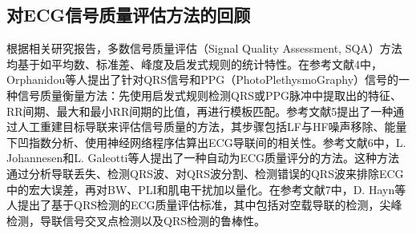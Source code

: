 \subsection{对ECG信号质量评估方法的回顾}

根据相关研究报告，多数信号质量评估（Signal Quality Assessment, SQA）方法均基于如平均数、标准差、峰度及启发式规则的统计特性。在参考文献4中，Orphanidou等人提出了针对QRS信号和PPG（PhotoPlethysmoGraphy）信号的一种信号质量衡量方法：先使用启发式规则检测QRS或PPG脉冲中提取出的特征、RR间期、最大和最小RR间期的比值，再进行模板匹配。参考文献5提出了一种通过人工重建目标导联来评估信号质量的方法，其步骤包括LF与HF噪声移除、能量下凹指数分析、使用神经网络程序估算出ECG导联间的相关性。参考文献6中，L. Johannesen和L. Galeotti等人提出了一种自动为ECG质量评分的方法。这种方法通过分析导联丢失、检测QRS波、对QRS波分割、检测错误的QRS波来排除ECG中的宏大误差，再对BW、PLI和肌电干扰加以量化。在参考文献7中，D. Hayn等人提出了基于QRS检测的ECG质量评估标准，其中包括对空载导联的检测，尖峰检测，导联信号交叉点检测以及QRS检测的鲁棒性。

